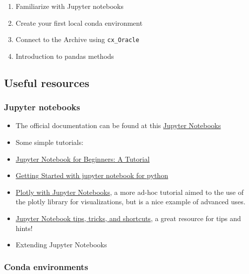 \documentclass[11pt]{article}
\providecommand{\tightlist}{%
      \setlength{\itemsep}{0pt}\setlength{\parskip}{0pt}}
\begin{document}
\begin{enumerate}
\def\labelenumi{\arabic{enumi}.}
\tightlist
\item
  Familiarize with Jupyter notebooks
\item
  Create your first local conda environment
\item
  Connect to the Archive using \texttt{cx\_Oracle}
\item
  Introduction to pandas methods
\end{enumerate}

\subsection{Useful resources}\label{useful-resources}

\subsubsection{Jupyter notebooks}\label{jupyter-notebooks}

\begin{itemize}
\tightlist
\item
  The official documentation can be found at this
  \href{http://jupyter-notebook.readthedocs.io/en/stable/}{Jupyter
  Notebooks}
\item
  Some simple tutorials:
\item
  \href{https://www.dataquest.io/blog/jupyter-notebook-tutorial/}{Jupyter
  Notebook for Beginners: A Tutorial}
\item
  \href{https://codingthesmartway.com/getting-started-with-jupyter-notebook-for-python/}{Getting
  Started with jupyter notebook for python}
\item
  \href{https://plot.ly/python/ipython-notebook-tutorial/}{Plotly with
  Jupyter Notebooks}, a more ad-hoc tutorial aimed to the use of the
  plotly library for visualizations, but is a nice example of advanced
  uses.
\item
  \href{https://www.dataquest.io/blog/jupyter-notebook-tips-tricks-shortcuts/}{Jupyter
  Notebook tips, tricks, and shortcuts}, a great resource for tips and
  hints!
\item
  Extending Jupyter Notebooks
\end{itemize}

\subsubsection{Conda environments}\label{conda-environments}
\end{document}

